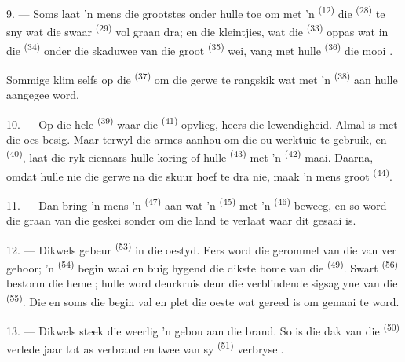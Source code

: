 9. --- Soms laat 'n mens die grootstes onder hulle toe om met 'n 
\textsuperscript{(12)} die  \textsuperscript{(28)} te sny wat die swaar
 \textsuperscript{(29)} vol graan dra; en die kleintjies, wat die
 \textsuperscript{(33)} oppas wat in die 
\textsuperscript{(34)} onder die skaduwee van die groot 
\textsuperscript{(35)} wei, vang met hulle  \textsuperscript{(36)} die mooi
.

Sommige klim selfs op die  \textsuperscript{(37)} om die gerwe te
rangskik wat met 'n  \textsuperscript{(38)} aan hulle aangegee word.

10. --- Op die hele  \textsuperscript{(39)} waar die 
\textsuperscript{(41)} opvlieg, heers die lewendigheid. Almal is met die oes besig. Maar
terwyl die armes aanhou om die ou werktuie te gebruik,  en
 \textsuperscript{(40)}, laat die ryk eienaars hulle koring of hulle
 \textsuperscript{(43)} met 'n  \textsuperscript{(42)}
maai. Daarna, omdat hulle nie die gerwe na die skuur hoef te dra nie, maak 'n mens groot
 \textsuperscript{(44)}.

11. --- Dan bring 'n mens 'n  \textsuperscript{(47)} aan wat 'n
 \textsuperscript{(45)} met 'n 
\textsuperscript{(46)} beweeg, en so word die graan van die  geskei sonder
om die land te verlaat waar dit gesaai is.

\VUsaut{5.0mm}
\VUsaut{3.4mm}

12. --- Dikwels gebeur  \textsuperscript{(53)} in die oestyd. Eers
word die gerommel van die  van ver gehoor; 'n  \textsuperscript{(54)} begin waai en buig hygend die dikste bome van die
 \textsuperscript{(49)}. Swart  \textsuperscript{(56)}
bestorm die hemel; hulle word deurkruis deur die verblindende sigsaglyne van die
 \textsuperscript{(55)}. Die  en soms die 
begin val en plet die oeste wat gereed is om gemaai te word.

13. --- Dikwels steek die weerlig 'n gebou aan die brand. So is die dak van die
 \textsuperscript{(50)} verlede jaar tot as verbrand en twee van sy
 \textsuperscript{(51)} verbrysel.

